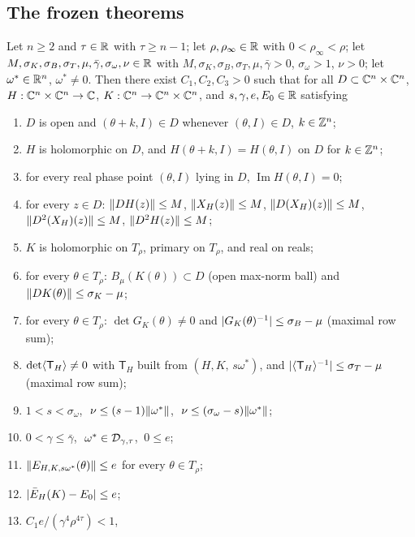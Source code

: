 \subsection{The frozen theorems}\label{bpI:p0:theorems}

\begin{theorem}\label{bpI:p0:g1}
Let $n\ge2$ and $\tau\in\mathbb{R}$ with $\tau\ge n-1$; let $\rho,\rho_\infty\in\mathbb{R}$ with $0<\rho_\infty<\rho$; let
$M,\sigma_K,\sigma_B,\sigma_T,\mu,\bar\gamma,\sigma_\omega,\nu\in\mathbb{R}$ with $M,\sigma_K,\sigma_B,\sigma_T,\mu,\bar\gamma>0$,
$\sigma_\omega>1$, $\nu>0$; let $\omega^*\in\mathbb{R}^n$, $\omega^*\ne0$. Then there exist $C_1,C_2,C_3>0$ such that
for all $D\subset\mathbb{C}^n\times\mathbb{C}^n$, $H:\mathbb{C}^n\times\mathbb{C}^n\to\mathbb{C}$, $K:\mathbb{C}^n\to\mathbb{C}^n\times\mathbb{C}^n$, and $s,\gamma,e,E_0\in\mathbb{R}$ satisfying
\begin{enumerate}[label=(I\arabic*)]
\item $D$ is open and $(\theta+k,I)\in D$ whenever $(\theta,I)\in D$, $k\in\mathbb{Z}^n$;
\item $H$ is holomorphic on $D$, and $H(\theta+k,I)=H(\theta,I)$ on $D$ for $k\in\mathbb{Z}^n$;
\item for every real phase point $(\theta,I)$ lying in $D$, $\operatorname{Im}H(\theta,I)=0$;
\item for every $z\in D$: $\lVert DH(z)\rVert\le M$, $\lVert X_H(z)\rVert\le M$, $\lVert D(X_H)(z)\rVert\le M$, $\lVert D^2(X_H)(z)\rVert\le M$,
  $\lVert D^2H(z)\rVert\le M$;
\item $K$ is holomorphic on $T_\rho$, primary on $T_\rho$, and real on reals;
\item for every $\theta\in T_\rho$: $B_\mu(K(\theta))\subset D$ (open max-norm ball) and $\lVert DK(\theta)\rVert\le\sigma_K-\mu$;
\item for every $\theta\in T_\rho$: $\det G_K(\theta)\ne0$ and $\lvert G_K(\theta)^{-1}\rvert\le\sigma_B-\mu$ (maximal row sum);
\item $\det\langle \mathsf T_H\rangle\ne0$ with $\mathsf T_H$ built from $(H,K,\,s\omega^*)$, and $\lvert \langle \mathsf T_H\rangle^{-1}\rvert\le\sigma_T-\mu$
  (maximal row sum);
\item $1<s<\sigma_\omega$, $\ \nu\le(s-1)\lVert \omega^*\rVert$, $\ \nu\le(\sigma_\omega-s)\norm{\omega^*}$;
\item $0<\gamma\le\bar\gamma$, $\ \omega^*\in\mathcal{D}_{\gamma,\tau}$, $\ 0\le e$;
\item $\lVert E_{H,K,s\omega^*}(\theta)\rVert\le e$ for every $\theta\in T_\rho$;
\item $\lvert \bar E_H(K)-E_0\rvert\le e$;
\item $C_1e/(\gamma^4\rho^{4\tau})<1$,

\end{enumerate}
\end{theorem}
